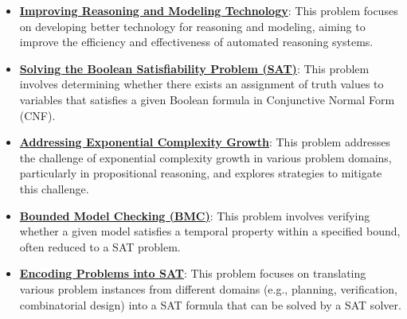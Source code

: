 \documentclass{article}%
\begin{document}
\begin{itemize}[leftmargin=*]%
\item \href{https://purdue.brightspace.com/d2l/common/assets/pdfjs-d2l-dist/1.0.14-legacy/web/viewer.html?file=\%2Fcontent\%2Fenforced\%2F1095467-wl.202510.CS.24300.001\%2F15L2-SAT.pdf\%3Fou\%3D1095467\&lang=en-us\&container=d2l-fileviewer-rendered-pdf\&fullscreen=d2l-fileviewer-rendered-pdf-dialog\&height=667#page=3}{\textbf{Improving Reasoning and Modeling Technology}}: This problem focuses on developing better technology for reasoning and modeling, aiming to improve the efficiency and effectiveness of automated reasoning systems.%
\item \href{https://purdue.brightspace.com/d2l/common/assets/pdfjs-d2l-dist/1.0.14-legacy/web/viewer.html?file=\%2Fcontent\%2Fenforced\%2F1095467-wl.202510.CS.24300.001\%2F15L2-SAT.pdf\%3Fou\%3D1095467\&lang=en-us\&container=d2l-fileviewer-rendered-pdf\&fullscreen=d2l-fileviewer-rendered-pdf-dialog\&height=667#page=2}{\textbf{Solving the Boolean Satisfiability Problem (SAT)}}: This problem involves determining whether there exists an assignment of truth values to variables that satisfies a given Boolean formula in Conjunctive Normal Form (CNF).%
\item \href{https://purdue.brightspace.com/d2l/common/assets/pdfjs-d2l-dist/1.0.14-legacy/web/viewer.html?file=\%2Fcontent\%2Fenforced\%2F1095467-wl.202510.CS.24300.001\%2F15L2-SAT.pdf\%3Fou\%3D1095467\&lang=en-us\&container=d2l-fileviewer-rendered-pdf\&fullscreen=d2l-fileviewer-rendered-pdf-dialog\&height=667#page=4}{\textbf{Addressing Exponential Complexity Growth}}: This problem addresses the challenge of exponential complexity growth in various problem domains, particularly in propositional reasoning, and explores strategies to mitigate this challenge.%
\item \href{https://purdue.brightspace.com/d2l/common/assets/pdfjs-d2l-dist/1.0.14-legacy/web/viewer.html?file=\%2Fcontent\%2Fenforced\%2F1095467-wl.202510.CS.24300.001\%2F15L2-SAT.pdf\%3Fou\%3D1095467\&lang=en-us\&container=d2l-fileviewer-rendered-pdf\&fullscreen=d2l-fileviewer-rendered-pdf-dialog\&height=667#page=6}{\textbf{Bounded Model Checking (BMC)}}: This problem involves verifying whether a given model satisfies a temporal property within a specified bound, often reduced to a SAT problem.%
\item \href{https://purdue.brightspace.com/d2l/common/assets/pdfjs-d2l-dist/1.0.14-legacy/web/viewer.html?file=\%2Fcontent\%2Fenforced\%2F1095467-wl.202510.CS.24300.001\%2F15L2-SAT.pdf\%3Fou\%3D1095467\&lang=en-us\&container=d2l-fileviewer-rendered-pdf\&fullscreen=d2l-fileviewer-rendered-pdf-dialog\&height=667#page=40}{\textbf{Encoding Problems into SAT}}: This problem focuses on translating various problem instances from different domains (e.g., planning, verification, combinatorial design) into a SAT formula that can be solved by a SAT solver.%

\end{itemize}
\end{document}

